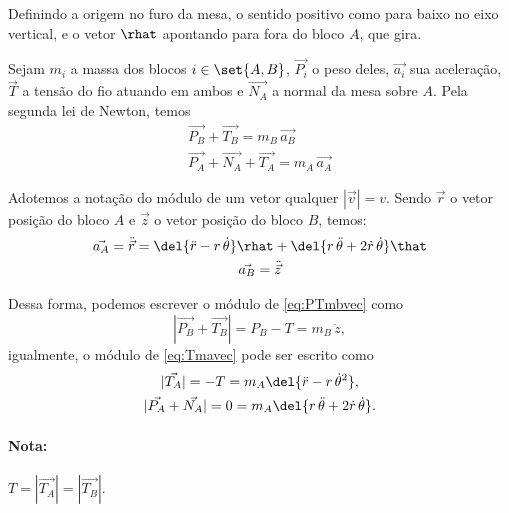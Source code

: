 \documentclass[]{IMTexam}
\begin{document}
\begin{questions}
\begin{solution}
\begin{multi}
			\nextcol

			\begin{unindent}
				\item Definindo a origem no furo da mesa, o sentido positivo como para baixo no eixo vertical, e o vetor $ \rhat $ apontando para fora do bloco $ A $, que gira.

				Sejam $ m_i $ a massa dos blocos $ i\in\set{A,B} $, $ \vec{P_i} $ o peso deles, $ \vec{a_i} $ sua aceleração, $ \vec{T} $ a tensão do fio atuando em ambos e $\vec{N_A}$ a normal da mesa sobre $ A $. Pela segunda lei de Newton, temos
				\begin{gather}
					\vec{P_B}+\vec{T_B}=m_B\,\vec{a_B}\label{eq:PTmbvec}\\
					\vec{P_A}+\vec{N_A}+\vec{T_A}=m_A\,\vec{a_A}\label{eq:Tmavec}
				\end{gather}

				\item Adotemos a notação do módulo de um vetor qualquer $ |\vec{v}|=v $. Sendo $ \vec{r} $ o vetor posição do bloco $ A $ e $ \vec{z} $ o vetor posição do bloco $ B $, temos:
				\begin{gather*}
					\vec{a_A}=\ddot{\vec{r}}=\del{\ddot{r}-r\,\dot{\theta}}\rhat+\del{r\,\ddot{\theta}+2\dot{r}\,\dot{\theta}}\that\\
					\vec{a_B}=\ddot{\vec{z}}
				\end{gather*}
			\end{unindent}

		\end{multi}


		Dessa forma, podemos escrever o módulo de \ref{eq:PTmbvec} como
		\begin{equation}\label{eq:modaccB}
			|\vec{P_B}+\vec{T_B}|=P_B-T=m_B\,\ddot{z},
		\end{equation}
		igualmente, o módulo de \ref{eq:Tmavec} pode ser escrito como
		\begin{gather}
			|\vec{T_A}|=-T=m_A\del{\ddot{r}-r\,\dot{\theta}^{2}},\label{eq:modaccAr}\\
			|\vec{P_A}+\vec{N_A}|=0=m_A\del{r\,\ddot{\theta}+2\dot{r}\,\dot{\theta}}.\label{eq:modaccAt}
		\end{gather}
		\paragraph{Nota:} $ T=|\vec{T_A}|=|\vec{T_B}| $.


\end{solution}
\end{questions}
\end{document}
